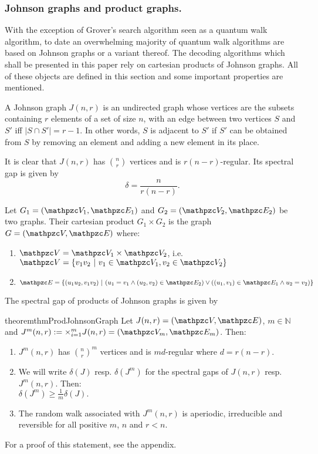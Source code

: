 \subsubsection{Johnson graphs and product graphs.}
With the exception of Grover's search algorithm seen as a quantum walk algorithm, to date an overwhelming majority of quantum walk algorithms are based on Johnson graphs or a variant thereof. The decoding algorithms which shall be presented in this paper rely on cartesian products of Johnson graphs. All of these objects are defined in this section and some important properties are mentioned.
\begin{definition}
\label{def_johnson_graph}
A Johnson graph $J(n,r)$ is an undirected graph whose vertices are the subsets containing $r$ elements of a set of size $n$, with an edge between two vertices $S$ and $S'$ iff $|S \cap S'| = r-1$. In other words, $S$ is adjacent to $S'$ if $S'$ can be obtained from $S$ by removing an element and adding a new element in its place.
\end{definition}
It is clear that $J(n,r)$ has $\binom{n}{r}$ vertices and is $r(n-r)$-regular. Its spectral gap is given by
\begin{equation}
\label{eq:spectral_gap_johnson}
\delta = \frac{n}{r(n-r)}.
\end{equation}
\begin{definition}
\label{def_product_graphs}
Let $G_1 = (\zV_1, \zE_1)$ and $G_2 = (\zV_2,\zE_2)$ be two graphs. Their cartesian product $G_1 \times G_2$ is the graph $G = (\zV,\zE)$ where:
\begin{enumerate}
  \item $\zV = \zV_1 \times \zV_2$, i.e. $\zV = \{v_1v_2~|~v_1 \in \zV_1, v_2 \in \zV_2\}$
  \item $\zE = \{(u_1u_2,v_1v_2)~|~ (u_1 = v_1 \wedge (u_2,v_2) \in \zE_2) \vee ((u_1,v_1) \in \zE_1 \wedge u_2 = v_2)\}$
\end{enumerate}
\end{definition}
The spectral gap of products of Johnson graphs is given by
\begin{restatable}{theorem}{thmProdJohnsonGraph}
\label{thm:product_johnsongraphs}
Let $J(n,r) = (\zV,\zE)$, $m \in \mathbb{N}$ and $J^m(n,r) := \times_{i=1}^m J(n,r) = (\zV_m,\zE_m)$. Then:
\begin{enumerate}
  \item $J^m(n,r)$ has $\binom{n}{r}^m$ vertices and is $md$-regular where $d = r(n-r)$.
  \item We will write $\delta(J)$ resp. $\delta(J^m)$ for the spectral gaps of $J(n,r)$ resp. $J^m(n,r)$. Then:\\
$\delta(J^m) \geq \frac{1}{m}\delta(J).$
 \item The random walk associated with $J^m(n,r)$ is  aperiodic, irreducible and reversible for all positive $m$, $n$ and $r<n$.
\end{enumerate}
\end{restatable}
For a proof of this statement, see the appendix.
